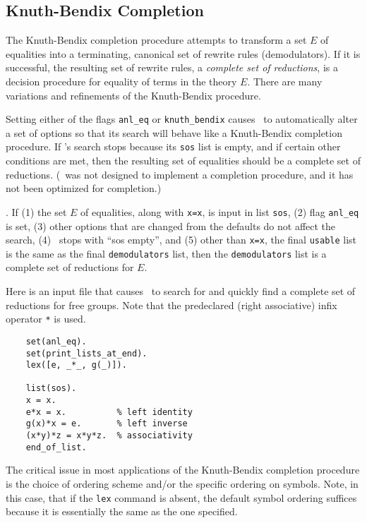 \documentclass[11pt]{article}
\begin{document}
\subsection{Knuth-Bendix Completion} \label{kb}

The Knuth-Bendix completion procedure \cite{knuth-bendix} attempts to
transform a set $E$ of equalities into a terminating, canonical set of
rewrite rules (demodulators).  If it is successful, the resulting set
of rewrite rules, a {\em complete set of reductions}, is a decision
procedure for equality of terms in the theory $E$.  There are many
variations and refinements of the Knuth-Bendix procedure.

Setting either of the flags
\verb:anl_eq: or
\verb:knuth_bendix:
causes \otter\ to automatically
alter a set of options so that its search will behave like a
Knuth-Bendix completion procedure.  If \otter's search stops because
its \verb:sos: list is empty, and if certain other conditions are met,
then the resulting set of equalities should be a complete set of reductions.
(\otter\ was not designed to implement a completion
procedure, and it has not been optimized for completion.)

.  If (1) the set $E$ of equalities, along
with \verb:x=x:, is input in list \verb:sos:,
(2) flag \verb:anl_eq: is set, (3) other options that are changed
from the defaults do not affect the search, (4) \otter\ stops with
``sos empty'', and (5) other than \verb:x=x:, the final \verb:usable: list is
the same as the final \verb:demodulators: list, then the \verb:demodulators:
list is a complete set of reductions for $E$.

Here is an input file that causes \otter\ to search for and quickly
find a complete set of reductions for free groups.  Note that the
predeclared (right associative) infix operator \verb:*: is used.

{\small
\begin{verbatim}
    set(anl_eq).
    set(print_lists_at_end).
    lex([e, _*_, g(_)]).

    list(sos).
    x = x.
    e*x = x.          % left identity
    g(x)*x = e.       % left inverse
    (x*y)*z = x*y*z.  % associativity
    end_of_list.
\end{verbatim}
}
\noindent
The critical issue in most applications of the Knuth-Bendix completion
procedure is the choice of ordering scheme and/or the specific
ordering on symbols.  Note, in this case, that if the \verb:lex:
command is absent, the default symbol ordering suffices because
it is essentially the same as the one specified.
\end{document}
